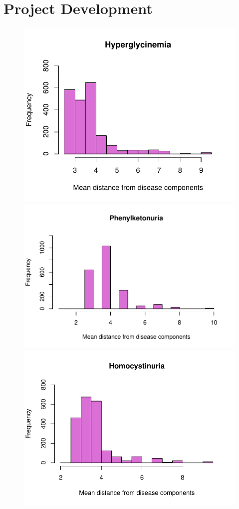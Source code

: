 \chapter{Project Development}
\begin{figure}[h!]
    \centering
    \includegraphics[scale=0.2]{Images/Hyperglycinemia.pdf}
    \includegraphics[scale=0.2]{Images/Phenylketonuria.pdf}
    \includegraphics[scale=0.2]{Images/Homocystinuria.pdf}

\end{figure}
